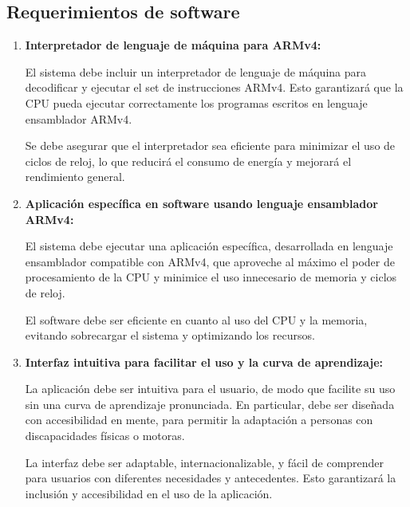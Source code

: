 \documentclass[conference]{IEEEtran}
\begin{document}
\subsection{Requerimientos de software}
\begin{enumerate}
	\item \textbf{Interpretador de lenguaje de máquina para ARMv4:}
	\par El sistema debe incluir un interpretador de lenguaje de máquina para decodificar y ejecutar el set de instrucciones ARMv4. Esto garantizará que la CPU pueda ejecutar correctamente los programas escritos en lenguaje ensamblador ARMv4.
	
	\par Se debe asegurar que el interpretador sea eficiente para minimizar el uso de ciclos de reloj, lo que reducirá el consumo de energía y mejorará el rendimiento general.
	
	\item \textbf{Aplicación específica en software usando lenguaje ensamblador ARMv4:}
	\par El sistema debe ejecutar una aplicación específica, desarrollada en lenguaje ensamblador compatible con ARMv4, que aproveche al máximo el poder de procesamiento de la CPU y minimice el uso innecesario de memoria y ciclos de reloj.
	
	\par El software debe ser eficiente en cuanto al uso del CPU y la memoria, evitando sobrecargar el sistema y optimizando los recursos.
	
	\item \textbf{Interfaz intuitiva para facilitar el uso y la curva de aprendizaje:}
	\par La aplicación debe ser intuitiva para el usuario, de modo que facilite su uso sin una curva de aprendizaje pronunciada. En particular, debe ser diseñada con accesibilidad en mente, para permitir la adaptación a personas con discapacidades físicas o motoras.
	
	\par La interfaz debe ser adaptable, internacionalizable, y fácil de comprender para usuarios con diferentes necesidades y antecedentes. Esto garantizará la inclusión y accesibilidad en el uso de la aplicación.
\end{enumerate}
\end{document}
